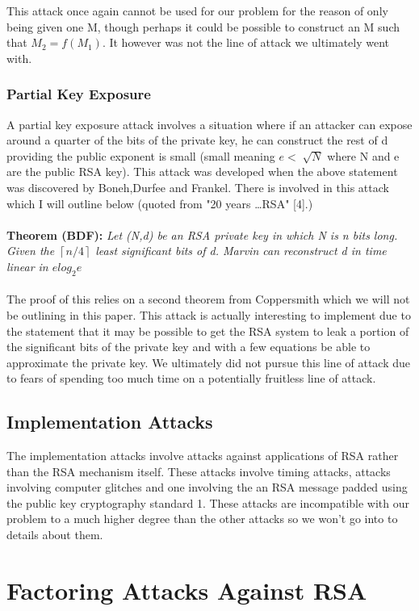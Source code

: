 \documentclass[12pt]{article} %
\begin{document}
	This attack once again cannot be used for our problem for the reason of only being given one M, though perhaps it could be possible to construct an M such that $ M_2 = f(M_1) $. It however was not the line of attack we ultimately went with.
	
	\subsubsection{Partial Key Exposure}
	A partial key exposure attack involves a situation where if an attacker can expose around a quarter of the bits of the private key, he can construct the rest of d providing the public exponent is small (small meaning $e <\sqrt[]{N}$ where N and e are the public RSA key). This attack was developed when the above statement was discovered by Boneh,Durfee and Frankel. There is involved in this attack which I will outline below (quoted from "20 years \dots RSA" [4].)
	\\\\
	\textbf{Theorem (BDF): }\textit{Let (N,d) be an RSA private key in which N is n bits long. Given the $\left\lceil n/4 \right\rceil$ least significant bits of d. Marvin can reconstruct d in time linear in $elog_2e$}
	\\\\
	The proof of this relies on a second theorem from Coppersmith which we will not be outlining in this paper. This attack is actually interesting to implement due to the statement that it may be possible to get the RSA system to leak a portion of the significant bits of the private key and with a few equations be able to approximate the private key. We ultimately did not pursue this line of attack due to fears of spending too much time on a potentially fruitless line of attack. 
	
	
	\subsection{Implementation Attacks}
	The implementation attacks involve attacks against applications of RSA rather than the RSA mechanism itself. These
	attacks involve timing attacks, attacks involving computer glitches and one involving the an RSA message padded using
	the public key cryptography standard 1. These attacks are incompatible with our problem to a much higher degree than
	the other attacks so we won't go into to details about them.
	\section{Factoring Attacks Against RSA}
\end{document}
